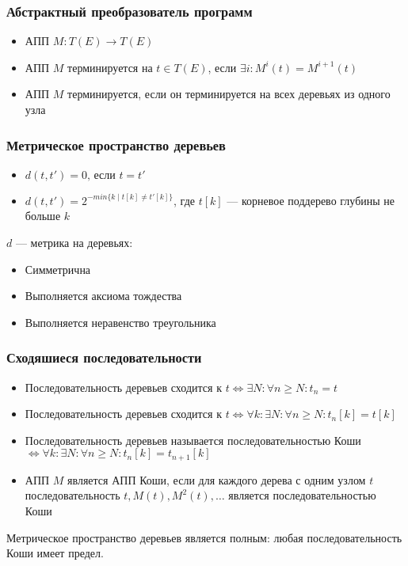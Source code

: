 \documentclass{beamer}
\def\iff{\Leftrightarrow}
\begin{document}
\begin{frame}[fragile]
  \transwipe[direction=90]
  \frametitle{Абстрактный преобразователь программ}
  \begin{itemize}
    \item АПП $M : T(E) \to T(E)$
    \item АПП $M$ терминируется на $t \in T(E)$, если $\exists i : M^i(t) = M^{i+1}(t)$
    \item АПП $M$ терминируется, если он терминируется на всех деревьях из одного узла
  \end{itemize}

\end{frame}


\begin{frame}[fragile]
  \transwipe[direction=90]
  \frametitle{Метрическое пространство деревьев}
  \begin{itemize}
    \item $d(t, t') = 0 \text{, если } t = t'$
    \item $d(t, t') = 2^{- min \{k \mid t[k] \neq t'[k] \}}$, где $t[k]$ --- корневое поддерево глубины не больше $k$
  \end{itemize}

$d$ --- метрика на деревьях:

  \begin{itemize}
    \item Симметрична
    \item Выполняется аксиома тождества
    \item Выполняется неравенство треугольника
  \end{itemize}

\end{frame}

\begin{frame}[fragile]
  \transwipe[direction=90]
  \frametitle{Сходяшиеся последовательности}

  \begin{itemize}
    \item Последовательность деревьев сходится к $t \iff \exists N : \forall n \geq N : t_n = t$

    \item Последовательность деревьев сходится к $t \iff \forall k : \exists N : \forall n \geq N: t_n[k] = t[k]$
    \item Последовательность деревьев называется последовательностью Коши $\iff \forall k : \exists N : \forall n \geq N: t_n[k] = t_{n+1}[k]$
  \end{itemize}

  \begin{itemize}
    \item АПП $M$ является АПП Коши, если для каждого дерева с одним узлом $t$ последовательность $t, M(t), M^2(t), \dots$ является последовательностью Коши
  \end{itemize}

\vfill 

  Метрическое пространство деревьев является полным: любая последовательность Коши имеет предел.
\end{frame}
\end{document}
